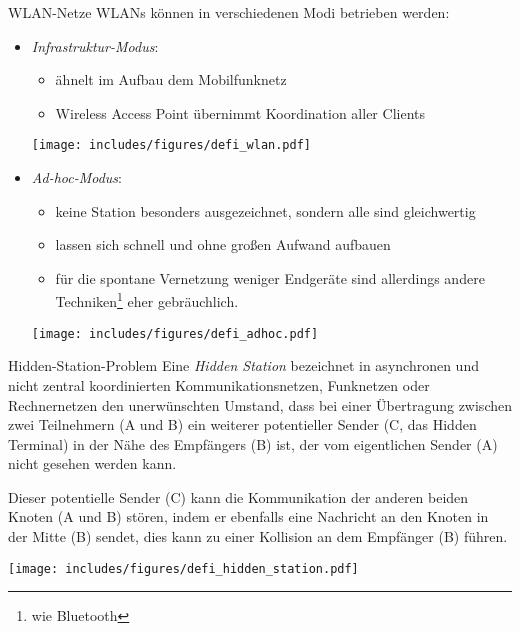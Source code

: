 \begin{defi}{WLAN-Netze}
    WLANs können in verschiedenen Modi betrieben werden:
    \begin{itemize}
        \item \emph{Infrastruktur-Modus}:
              \begin{itemize}
                  \item ähnelt im Aufbau dem Mobilfunknetz
                  \item Wireless Access Point übernimmt Koordination aller Clients
              \end{itemize}
              \begin{center}
                  \vspace{1em}
                  \texttt{[image: includes/figures/defi\_wlan.pdf]}
              \end{center}
        \item \emph{Ad-hoc-Modus}:
              \begin{itemize}
                  \item keine Station besonders ausgezeichnet, sondern alle sind gleichwertig
                  \item lassen sich schnell und ohne großen Aufwand aufbauen
                  \item für die spontane Vernetzung weniger Endgeräte sind allerdings andere Techniken\footnote{wie Bluetooth} eher gebräuchlich.
              \end{itemize}
              \begin{center}
                  \vspace{1em}
                  \texttt{[image: includes/figures/defi\_adhoc.pdf]}
              \end{center}
    \end{itemize}
\end{defi}

\begin{defi}{Hidden-Station-Problem}
    Eine \emph{Hidden Station} bezeichnet in asynchronen und nicht zentral koordinierten Kommunikationsnetzen, Funknetzen oder Rechnernetzen den unerwünschten Umstand, dass bei einer Übertragung zwischen zwei Teilnehmern (A und B) ein weiterer potentieller Sender (C, das Hidden Terminal) in der Nähe des Empfängers (B) ist, der vom eigentlichen Sender (A) nicht gesehen werden kann.

    Dieser potentielle Sender (C) kann die Kommunikation der anderen beiden Knoten (A und B) stören, indem er ebenfalls eine Nachricht an den Knoten in der Mitte (B) sendet, dies kann zu einer Kollision an dem Empfänger (B) führen.

    \centering
    \texttt{[image: includes/figures/defi\_hidden\_station.pdf]}
\end{defi}

